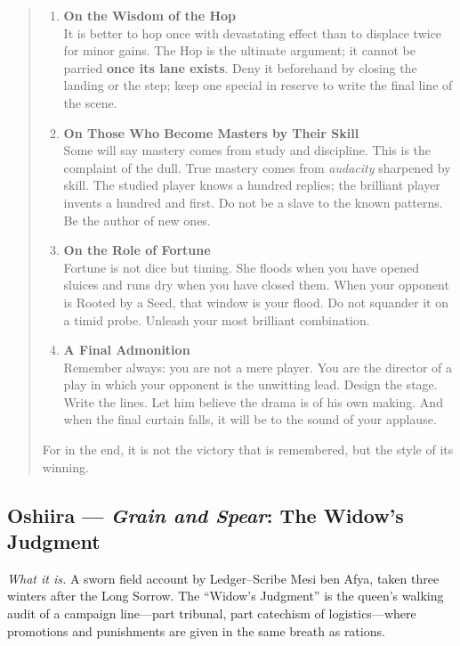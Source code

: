 \documentclass[11pt]{article}
\begin{document}
\begin{quote}
\begin{enumerate}[leftmargin=*,label=\textbf{\Roman*.}]
\item \textbf{On the Wisdom of the Hop}\\
It is better to hop once with devastating effect than to displace twice for minor gains. The Hop is the ultimate argument; it cannot be parried \textbf{once its lane exists}. Deny it beforehand by closing the landing or the step; keep one special in reserve to write the final line of the scene.

\item \textbf{On Those Who Become Masters by Their Skill}\\
Some will say mastery comes from study and discipline. This is the complaint of the dull. True mastery comes from \emph{audacity} sharpened by skill. The studied player knows a hundred replies; the brilliant player invents a hundred and first. Do not be a slave to the known patterns. Be the author of new ones.

\item \textbf{On the Role of Fortune}\\
Fortune is not dice but timing. She floods when you have opened sluices and runs dry when you have closed them. When your opponent is Rooted by a Seed, that window is your flood. Do not squander it on a timid probe. Unleash your most brilliant combination.

\item \textbf{A Final Admonition}\\
Remember always: you are not a mere player. You are the director of a play in which your opponent is the unwitting lead. Design the stage. Write the lines. Let him believe the drama is of his own making. And when the final curtain falls, it will be to the sound of your applause.
\end{enumerate}

\medskip
For in the end, it is not the victory that is remembered, but the style of its winning.
\end{quote}

\clearpage

\subsection{Oshiira — \textit{Grain and Spear}: The Widow’s Judgment}
\textit{What it is.} A sworn field account by Ledger–Scribe Mesi ben Afya, taken three winters after the Long Sorrow. The “Widow’s Judgment” is the queen’s walking audit of a campaign line—part tribunal, part catechism of logistics—where promotions and punishments are given in the same breath as rations.
\end{document}
